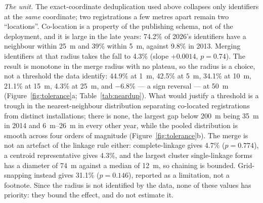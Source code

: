 \documentclass{article}
\newcommand{\tolFallOne}{44.9}
\newcommand{\tolFallFive}{42.5}
\newcommand{\tolFallTen}{34.1}
\newcommand{\tolFallFifteen}{21.1}
\newcommand{\tolFallFifty}{-6.8}
\newcommand{\clFall}{4.7}
\newcommand{\clP}{0.774}
\newcommand{\chainMax}{74}
\newcommand{\chainMedian}{12}
\newcommand{\gridSnapFall}{31.1}
\newcommand{\gridSnapP}{0.146}
\newcommand{\nnGapMax}{35}
\begin{document}
\noindent\emph{The unit.} The exact-coordinate deduplication used above collapses only
identifiers at the \emph{same} coordinate; two registrations a few metres apart remain two
``locations''. Co-location is a property of the publishing schema, not of the deployment, and it
is large in the late years: \num{74.2}\% of 2026's identifiers have a neighbour within
\SI{25}{\meter} and \num{39}\% within \SI{5}{\meter}, against \num{9.8}\% in 2013. Merging
identifiers at that radius takes the fall to \num{4.3}\% (slope $+0.0014$, $p = 0.74$). The
result is monotone in the merge radius with no plateau, so the radius is a choice, not a
threshold the data identify: \num{\tolFallOne}\% at \SI{1}{\meter}, \num{\tolFallFive}\% at
\SI{5}{\meter}, \num{\tolFallTen}\% at \SI{10}{\meter}, \num{\tolFallFifteen}\% at
\SI{15}{\meter}, \num{4.3}\% at \SI{25}{\meter}, and \num{\tolFallFifty}\% --- a sign reversal
--- at \SI{50}{\meter} (Figure~\ref{fig:tolerance}a; Table~\ref{tab:neardup}). What would justify a threshold is a trough
in the nearest-neighbour distribution separating co-located registrations from distinct
installations; there is none, the largest gap below \SI{200}{\meter} being \SI{\nnGapMax}{\meter}
in 2014 and \SIrange{6}{26}{\meter} in every other year, while the pooled distribution is smooth
across four orders of magnitude (Figure~\ref{fig:tolerance}b). The merge is not an artefact of
the linkage rule either: complete-linkage gives \num{\clFall}\% ($p = \clP$), a centroid
representative gives \num{4.3}\%, and the largest cluster single-linkage forms has a diameter of
\SI{\chainMax}{\meter} against a median of \SI{\chainMedian}{\meter}, so chaining is bounded.
Grid-snapping instead gives \num{\gridSnapFall}\% ($p = \gridSnapP$), reported as a
limitation, not a footnote. Since the radius is not identified by the data, none of
these values has priority: they bound the effect, and do not estimate it.
\end{document}
